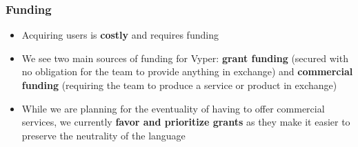 \documentclass[aspectratio=169]{beamer}
\begin{document}
	\begin{frame}
		\frametitle{Funding}
		
		\begin{itemize}
			\item Acquiring users is \textbf{costly} and requires funding
		\end{itemize}
		
		\vspace{1em}
		\begin{itemize}
			\item We see two main sources of funding for Vyper: \textbf{grant funding} (secured with no obligation for the team to provide anything in exchange) and \textbf{commercial funding} (requiring the team to produce a service or product in exchange)
			
		\end{itemize}
		
		\vspace{1em}
		\begin{itemize}
			\item While we are planning for the eventuality of having to offer commercial services, we currently \textbf{favor and prioritize grants} as they make it easier to preserve the neutrality of the language
		\end{itemize}
		
	\end{frame}
\end{document}
